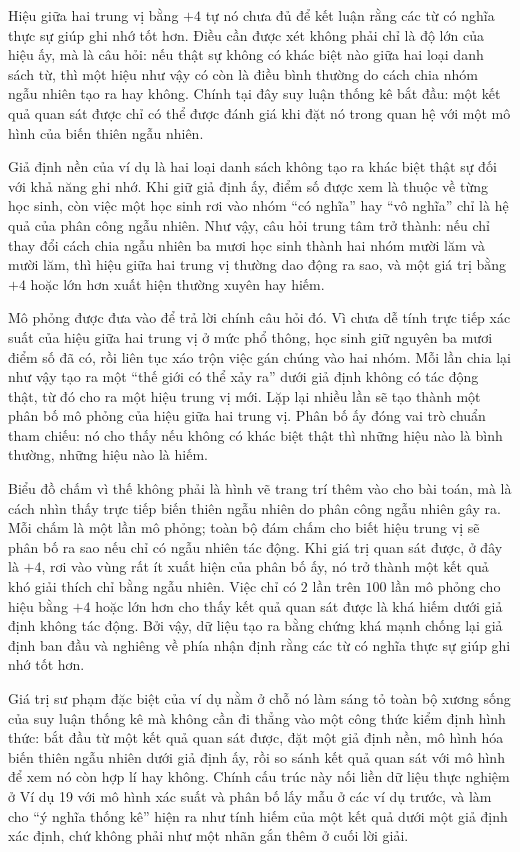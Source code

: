 \documentclass[
  10pt,
  a4paper,
  landscape,
  twoside,
  openany
]{scrbook}
\begin{document}
{
Hiệu giữa hai trung vị bằng $+4$ tự nó chưa đủ để kết luận rằng các từ có nghĩa thực sự giúp ghi nhớ tốt hơn. Điều cần được xét không phải chỉ là độ lớn của hiệu ấy, mà là câu hỏi: nếu thật sự không có khác biệt nào giữa hai loại danh sách từ, thì một hiệu như vậy có còn là điều bình thường do cách chia nhóm ngẫu nhiên tạo ra hay không. Chính tại đây suy luận thống kê bắt đầu: một kết quả quan sát được chỉ có thể được đánh giá khi đặt nó trong quan hệ với một mô hình của biến thiên ngẫu nhiên. 

Giả định nền của ví dụ là hai loại danh sách không tạo ra khác biệt thật sự đối với khả năng ghi nhớ. Khi giữ giả định ấy, điểm số được xem là thuộc về từng học sinh, còn việc một học sinh rơi vào nhóm “có nghĩa” hay “vô nghĩa” chỉ là hệ quả của phân công ngẫu nhiên. Như vậy, câu hỏi trung tâm trở thành: nếu chỉ thay đổi cách chia ngẫu nhiên ba mươi học sinh thành hai nhóm mười lăm và mười lăm, thì hiệu giữa hai trung vị thường dao động ra sao, và một giá trị bằng $+4$ hoặc lớn hơn xuất hiện thường xuyên hay hiếm. 

Mô phỏng được đưa vào để trả lời chính câu hỏi đó. Vì chưa dễ tính trực tiếp xác suất của hiệu giữa hai trung vị ở mức phổ thông, học sinh giữ nguyên ba mươi điểm số đã có, rồi liên tục xáo trộn việc gán chúng vào hai nhóm. Mỗi lần chia lại như vậy tạo ra một “thế giới có thể xảy ra” dưới giả định không có tác động thật, từ đó cho ra một hiệu trung vị mới. Lặp lại nhiều lần sẽ tạo thành một phân bố mô phỏng của hiệu giữa hai trung vị. Phân bố ấy đóng vai trò chuẩn tham chiếu: nó cho thấy nếu không có khác biệt thật thì những hiệu nào là bình thường, những hiệu nào là hiếm.

Biểu đồ chấm vì thế không phải là hình vẽ trang trí thêm vào cho bài toán, mà là cách nhìn thấy trực tiếp biến thiên ngẫu nhiên do phân công ngẫu nhiên gây ra. Mỗi chấm là một lần mô phỏng; toàn bộ đám chấm cho biết hiệu trung vị sẽ phân bố ra sao nếu chỉ có ngẫu nhiên tác động. Khi giá trị quan sát được, ở đây là $+4$, rơi vào vùng rất ít xuất hiện của phân bố ấy, nó trở thành một kết quả khó giải thích chỉ bằng ngẫu nhiên. Việc chỉ có $2$ lần trên $100$ lần mô phỏng cho hiệu bằng $+4$ hoặc lớn hơn cho thấy kết quả quan sát được là khá hiếm dưới giả định không tác động. Bởi vậy, dữ liệu tạo ra bằng chứng khá mạnh chống lại giả định ban đầu và nghiêng về phía nhận định rằng các từ có nghĩa thực sự giúp ghi nhớ tốt hơn.

Giá trị sư phạm đặc biệt của ví dụ nằm ở chỗ nó làm sáng tỏ toàn bộ xương sống của suy luận thống kê mà không cần đi thẳng vào một công thức kiểm định hình thức: bắt đầu từ một kết quả quan sát được, đặt một giả định nền, mô hình hóa biến thiên ngẫu nhiên dưới giả định ấy, rồi so sánh kết quả quan sát với mô hình để xem nó còn hợp lí hay không. Chính cấu trúc này nối liền dữ liệu thực nghiệm ở Ví dụ 19 với mô hình xác suất và phân bố lấy mẫu ở các ví dụ trước, và làm cho ``ý nghĩa thống kê'' hiện ra như tính hiếm của một kết quả dưới một giả định xác định, chứ không phải như một nhãn gắn thêm ở cuối lời giải. 
}
\end{document}
